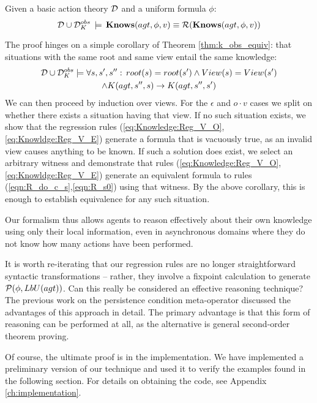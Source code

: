 \begin{thm}
\label{thm:Reg_KnowsO}Given a basic action theory $\mathcal{D}$ and a uniform
formula $\phi$:\[
\mathcal{D}\cup\mathcal{D}_{K}^{obs}\,\models\,\mathbf{Knows}(agt,\phi,v)\equiv\mathcal{R}(\mathbf{Knows}(agt,\phi,v))\]

\end{thm}
\begin{proofsketch}
The proof hinges on a simple corollary of Theorem \ref{thm:k_obs_equiv}:
that situations with the same root and same view entail the same knowledge:\begin{multline*}
\mathcal{D}\cup\mathcal{D}_{K}^{obs}\models\forall s,s',s'':\, root(s)=root(s')\wedge View(s)=View(s')\\
\wedge K(agt,s'',s)\rightarrow K(agt,s'',s')\end{multline*}
 We can then proceed by induction over views. For the $\epsilon$
and $o\cdot v$ cases we split on whether there exists a situation
having that view. If no such situation exists, we show that the regression
rules (\ref{eq:Knowledge:Reg_V_O}, \ref{eq:Knowldge:Reg_V_E}) generate
a formula that is vacuously true, as an invalid view causes anything
to be known. If such a solution does exist, we select an arbitrary
witness and demonstrate that rules (\ref{eq:Knowledge:Reg_V_O}, \ref{eq:Knowldge:Reg_V_E})
generate an equivalent formula to rules (\ref{eqn:R_do_c_s},\ref{eqn:R_s0})
using that witness. By the above corollary, this is enough to establish
equivalence for any such situation. 
\end{proofsketch}
Our formalism thus allows agents to reason effectively about their
own knowledge using only their local information, even in asynchronous
domains where they do not know how many actions have been performed.

It is worth re-iterating that our regression rules are no longer straightforward
syntactic transformations -- rather, they involve a fixpoint calculation
to generate $\mathcal{P}(\phi,LbU(agt))$. Can this really be considered
an effective reasoning technique? The previous work on the persistence
condition meta-operator discussed the advantages of this approach
in detail. The primary advantage is that this form of reasoning can
be performed at all, as the alternative is general second-order theorem
proving.

Of course, the ultimate proof is in the implementation. We have implemented
a preliminary version of our technique and used it to verify the examples
found in the following section. For details on obtaining the code,
see Appendix \ref{ch:implementation}.\\


